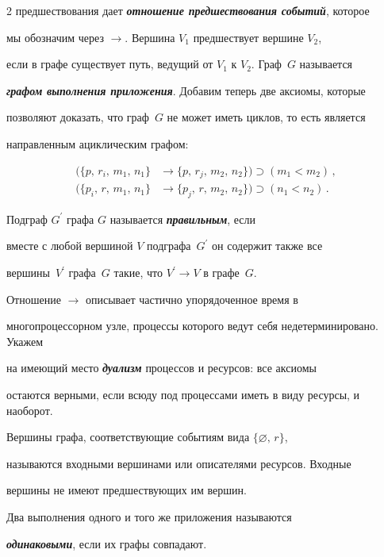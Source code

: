 \begin{multicols}{2}
предшествования дает {\bfseries\textit{отношение предшествования событий}}, которое

мы обозначим через $\rightarrow$. Вершина $V_1$ предшествует вершине $V_2$,

если в графе существует путь, ведущий от $V_1$ к $V_2$. Граф~$G$ называется

{\bfseries\textit{графом выполнения приложения}}. Добавим теперь две аксиомы, которые

позволяют доказать, что граф~$G$ не может иметь циклов, то есть является

на\-прав\-лен\-ным ациклическим графом:

\begin{align*}

(\{p,\,r_i,\,m_1,\,n_1\} &\rightarrow \{p,\,r_j,\,m_2,\,n_2\}) \supset (m_1 <  m_2)\,,\\

(\{p_i,\,r,\,m_1,\,n_1\}&\rightarrow \{p_j,\,r,\,m_2,\,n_2\}) \supset (n_1 <  n_2)\,.

\end{align*}



Подграф $G^\prime$ графа $G$ называется {\bfseries\textit{правильным}}, если 

вместе с любой вершиной $V$ подграфа~$G^\prime$ он содержит также все 

вершины~$V^\prime$ графа~$G$ такие, что $V^\prime \rightarrow V$ в графе~$G$. 

Отношение $\rightarrow$ описывает час\-тич\-но упорядоченное время в 

многопроцессорном узле, процессы которого ведут себя недетерминировано. Укажем 

на имеющий место {\bfseries\textit{дуализм}} процессов и ресурсов: все аксиомы 

остаются верными, если всюду под процессами иметь в виду ресурсы, и наоборот.



Вершины графа, соответствующие событиям вида $\{\varnothing ,\,r\}$,

называются входными вершинами или описателями ресурсов. Входные

вершины не имеют предшествующих им вершин.



Два выполнения одного и того же приложения называются

{\bfseries\textit{одинаковыми}}, если их графы совпадают.




\end{multicols}
